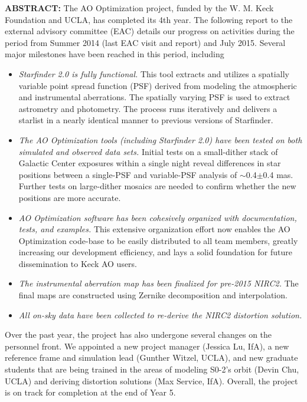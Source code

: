 \textbf{ABSTRACT:} The AO Optimization project, funded by the W. M. Keck Foundation and UCLA, has completed its 4th year. The following report to the external advisory committee (EAC) details our progress on activities during the period from Summer 2014 (last EAC visit and report) and July 2015. Several major milestones have been reached in this period, including
\begin{itemize}
\item {\em Starfinder 2.0 is fully functional.} This tool extracts and utilizes a spatially variable point spread function (PSF) derived from modeling the atmospheric and instrumental aberrations. The spatially varying PSF is used to extract astrometry and photometry. The process runs iteratively and delivers a starlist in a nearly identical manner to previous versions of Starfinder.

\item {\em The AO Optimization tools (including Starfinder 2.0) have been tested on both simulated and observed data sets.} Initial tests on a small-dither stack of Galactic Center exposures within a single night reveal differences in star positions between a single-PSF and variable-PSF analysis of $\sim$0.4$\pm$0.4 mas. Further tests on large-dither mosaics are needed to confirm whether the new positions are more accurate.

\item {\em AO Optimization software has been cohesively organized with documentation, tests, and examples.} This extensive organization effort now enables the AO Optimization code-base to be easily distributed to all team members, greatly increasing our development efficiency, and lays a solid foundation for future dissemination to Keck AO users.

\item {\em The instrumental aberration map has been finalized for pre-2015 NIRC2.} The final maps are constructed using Zernike decomposition and interpolation.

\item {\em All on-sky data have been collected to re-derive the NIRC2 distortion solution.}

\end{itemize}
Over the past year, the project has also undergone several changes on the personnel front. We appointed a new project manager (Jessica Lu, IfA), a new reference frame and simulation lead (Gunther Witzel, UCLA), and new graduate students that are being trained in the areas of modeling S0-2’s orbit (Devin Chu, UCLA) and deriving distortion solutions (Max Service, IfA). Overall, the project is on track for completion at the end of Year 5.


  